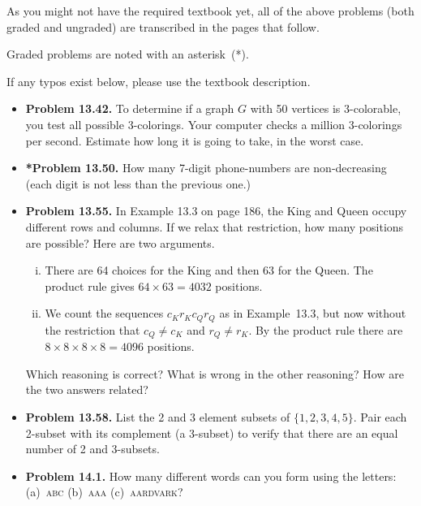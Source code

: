 \documentclass[11pt]{article}
\begin{document}
As you might not have the required textbook yet,
all of the above problems (both graded and ungraded)
are transcribed in the pages that follow.

Graded problems are noted with an asterisk~(*).

If any typos exist below, please use the textbook description.

\newpage
\begin{itemize}

\item \textbf{Problem 13.42.}
To determine if a graph $G$ with 50 vertices is 3-colorable,
you test all possible 3-colorings.
Your computer checks a million 3-colorings per second.
Estimate how long it is going to take, in the worst case.

\vspace{0.2in}

\item \textbf{*Problem 13.50.}
How many 7-digit phone-numbers are non-decreasing
(each digit is not less than the previous one.)

\vspace{0.2in}

\item \textbf{Problem 13.55.}
In Example 13.3 on page 186, the King and Queen occupy different rows and columns.
If we relax that restriction, how many positions are possible?
Here are two arguments.
\begin{enumerate}[(i)]
\item There are 64 choices for the King and then 63 for the Queen.
  The product rule gives $64\times63=4032$ positions.
\item We count the sequences $c_Kr_Kc_Qr_Q$ as in Example~13.3, but now without
  the restriction that $c_Q\ne c_K$ and $r_Q\ne r_K$.
  By the product rule there are $8\times8\times8\times8=4096$ positions.
\end{enumerate}
Which reasoning is correct?
What is wrong in the other reasoning?
How are the two answers related?

\vspace{0.2in}

\item \textbf{Problem 13.58.}
List the 2 and 3 element subsets of $\{1,2,3,4,5\}$.
Pair each 2-subset with its complement (a 3-subset) to verify
that there are an equal number of 2 and 3-subsets.

\vspace{0.2in}

\item \textbf{Problem 14.1.}
How many different words can you form using the letters:
(a)~\textsc{abc} (b)~\textsc{aaa} (c)~\textsc{aardvark}?


\end{itemize}
\end{document}
